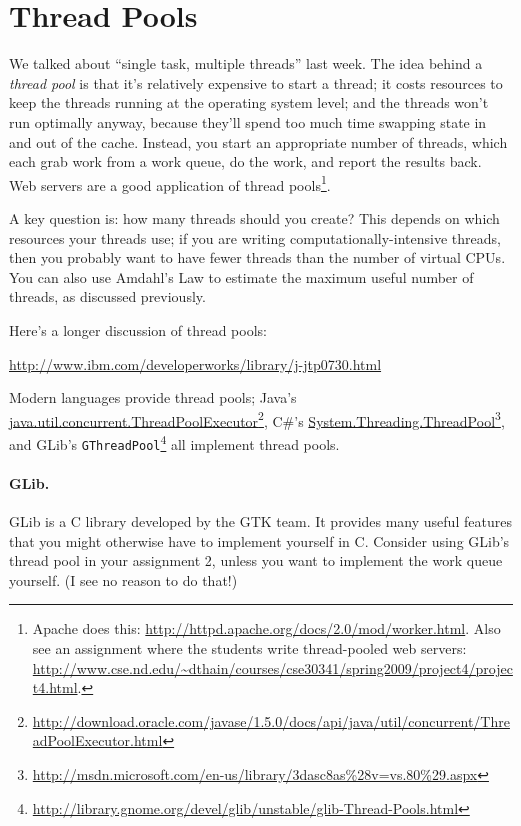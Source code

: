 \documentclass[11pt]{article}
\begin{document}
\section*{Thread Pools} We talked about ``single task, multiple threads''
last week. The idea behind a \emph{thread pool} is that it's relatively
expensive to start a thread; it costs resources to keep the threads
running at the operating system level; and the threads won't run
optimally anyway, because they'll spend too much time swapping state
in and out of the cache.  Instead, you start an appropriate number of
threads, which each grab work from a work queue, do the work,
and report the results back. Web servers are a good application of
thread pools\footnote{Apache does this: \url{http://httpd.apache.org/docs/2.0/mod/worker.html}. Also see an assignment where the students write thread-pooled web servers: \url{http://www.cse.nd.edu/~dthain/courses/cse30341/spring2009/project4/project4.html}.}.

A key question is: how many threads should you create?  This depends
on which resources your threads use; if you are writing
computationally-intensive threads, then you probably want to have
fewer threads than the number of virtual CPUs. You can also use
Amdahl's Law to estimate the maximum useful number of threads, as
discussed previously.

Here's a longer discussion of thread pools:

\begin{center}
\url{http://www.ibm.com/developerworks/library/j-jtp0730.html}
\end{center}

Modern languages provide thread pools; Java's
\url{java.util.concurrent.ThreadPoolExecutor}\footnote{\url{http://download.oracle.com/javase/1.5.0/docs/api/java/util/concurrent/ThreadPoolExecutor.html}}, C\#'s
\url{System.Threading.ThreadPool}\footnote{\url{http://msdn.microsoft.com/en-us/library/3dasc8as\%28v=vs.80\%29.aspx}}, and GLib's {\tt GThreadPool}\footnote{\url{http://library.gnome.org/devel/glib/unstable/glib-Thread-Pools.html}} all
implement thread pools. 

\paragraph{GLib.} 
GLib is a C library developed by the GTK team. It provides many useful
features that you might otherwise have to implement yourself in C.
Consider using GLib's thread pool in your assignment 2, unless you
want to implement the work queue yourself.  (I see no reason to do
that!)
\end{document}
